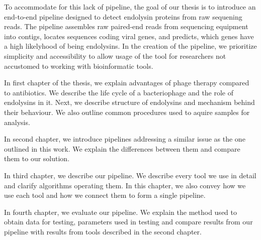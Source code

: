 To accommodate for this lack of pipeline, the goal of our thesis is to introduce an end-to-end pipeline designed to detect endolysin proteins from raw sequening reads. The pipeline assembles raw paired-end reads from sequencing equipment into contigs, locates sequences coding viral genes, and predicts, which genes have a high likelyhood of being endolysins. In the creation of the pipeline, we prioritize simplicity and accessibility to allow usage of the tool for researchers not accustomed to working with bioinformatic tools.

In first chapter of the thesis, we explain advantages of phage therapy compared to antibiotics. We describe the life cycle of a bacteriophage and the role of endolysins in it. Next, we describe structure of endolysins and mechanism behind their behaviour. We also outline common procedures used to aquire samples for analysis.

In second chapter, we introduce pipelines addressing a similar issue as the one outlined in this work. We explain the differences between them and compare them to our solution.

In third chapter, we describe our pipeline. We describe every tool we use in detail and clarify algorithms operating them. In this chapter, we also convey how we use each tool and how we connect them to form a single pipeline.

In fourth chapter, we evaluate our pipeline. We explain the method used to obtain data for testing, parameters used in testing and compare results from our pipeline with results from tools described in the second chapter.